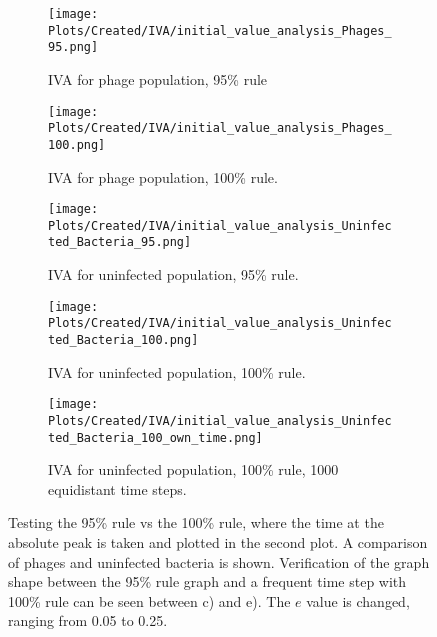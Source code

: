 \begin{figure}
    \centering
    \begin{subfigure}{1\linewidth}
        \centering
        \texttt{[image: Plots/Created/IVA/initial\_value\_analysis\_Phages\_95.png]}
        \caption{
            IVA for phage population, 95\% rule
        }
        \label{fig:appendixF:IVA_phage_95}
    \end{subfigure}
    \hfill
    \begin{subfigure}{1\linewidth}
        \centering
        \texttt{[image: Plots/Created/IVA/initial\_value\_analysis\_Phages\_100.png]}
        \caption{
            IVA for phage population, 100\% rule.  
        }
        \label{fig:appendixF:IVA_phages_100}
    \end{subfigure}
    \hfill
    \begin{subfigure}{1\linewidth}
        \centering
        \texttt{[image: Plots/Created/IVA/initial\_value\_analysis\_Uninfected\_Bacteria\_95.png]}
        \caption{
            IVA for uninfected population, 95\% rule. 
        }
        \label{fig:appendixF:IVA_uninfected_bacteria_95}
    \end{subfigure}
    \hfill 
    \begin{subfigure}{1\linewidth}
        \centering
        \texttt{[image: Plots/Created/IVA/initial\_value\_analysis\_Uninfected\_Bacteria\_100.png]}
        \caption{
            IVA for uninfected population, 100\% rule. 
        }
        \label{fig:appendixF:IVA_uninfected_bacteria_100}
    \end{subfigure}
    \begin{subfigure}{1\linewidth}
        \centering
        \texttt{[image: Plots/Created/IVA/initial\_value\_analysis\_Uninfected\_Bacteria\_100\_own\_time.png]}
        \caption{
            IVA for uninfected population, 100\% rule, 1000 equidistant time steps. 
        }
        \label{fig:appendixF:IVA_uninfected_bacteria_100_own_time}
    \end{subfigure}
    \caption{
        Testing the 95\% rule vs the 100\% rule, where the time at the absolute peak is taken and plotted in the second plot. 
        A comparison of phages and uninfected bacteria is shown. 
        Verification of the graph shape between the 95\% rule graph and a frequent time step with 100\% rule can be seen between c) and e). 
        The $e$ value is changed, ranging from 0.05 to 0.25. 
    }
    \label{fig:appendixF:IVA_95_vs_100}

\end{figure}